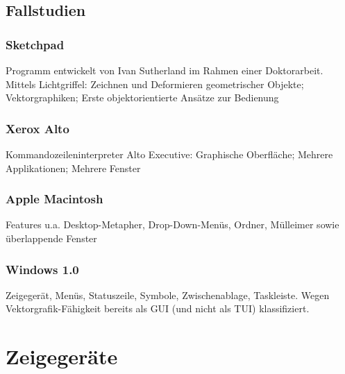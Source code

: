 \documentclass
[
	8pt,		%
	ngerman,	%
	a4paper,	%
	landscape,	%
	final		%
]{extarticle}
\begin{document}
\begin{multicols*}{4}
	\subsection{Fallstudien}
	\subsubsection*{Sketchpad}
	Programm entwickelt von Ivan Sutherland im Rahmen einer Doktorarbeit. \\
	Mittels Lichtgriffel: Zeichnen und Deformieren geometrischer Objekte;
	Vektorgraphiken; Erste objektorientierte Ansätze zur Bedienung
	\subsubsection*{Xerox Alto}
	Kommandozeileninterpreter Alto Executive: Graphische Oberfläche;
	Mehrere Applikationen; Mehrere Fenster
	\subsubsection*{Apple Macintosh}
	Features u.a. Desktop-Metapher, Drop-Down-Menüs, Ordner, Mülleimer sowie
	überlappende Fenster
	\subsubsection*{Windows 1.0}
	Zeigegerät, Menüs, Statuszeile, Symbole, Zwischenablage, Taskleiste.
	Wegen Vektorgrafik-Fähigkeit bereits als GUI (und nicht als TUI)
	klassifiziert.
	\section{Zeigegeräte}

\end{multicols*}
\end{document}
